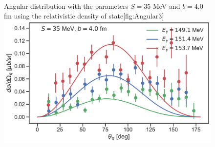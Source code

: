 \begin{figure}[H]
	\begin{sidecaption}{Angular distribution with the parameters $S=35$ MeV and $b=4.0$ fm using the relativistic density of state}[fig:Angular3]
		\includegraphics[width=\linewidth]{Figures/MultiDiffcross_rel_3.pdf}
	\end{sidecaption}
\end{figure}


